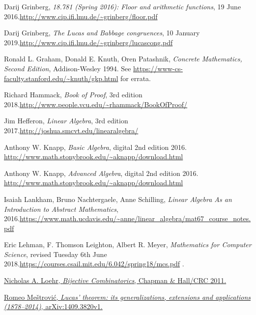 \documentclass[numbers=enddot,12pt,final,onecolumn,notitlepage]{scrartcl}%
\numberwithin{exer}{subsection}
\theoremstyle{definition}
\begin{document}
\begin{thebibliography}{999999999}
Darij Grinberg, \textit{18.781 (Spring 2016): Floor
and arithmetic functions}, 19 June 2016.\newline\url{http://www.cip.ifi.lmu.de/~grinberg/floor.pdf}

Darij Grinberg, \textit{The Lucas and Babbage
congruences}, 10 January 2019.\newline\url{http://www.cip.ifi.lmu.de/~grinberg/lucascong.pdf}

Ronald L. Graham, Donald E. Knuth, Oren Patashnik,
\textit{Concrete Mathematics, Second Edition}, Addison-Wesley 1994.\newline
See \url{https://www-cs-faculty.stanford.edu/~knuth/gkp.html} for errata.

Richard Hammack, \textit{Book of Proof}, 3rd
edition 2018.\newline\url{http://www.people.vcu.edu/~rhammack/BookOfProof/}

Jim Hefferon, \textit{Linear Algebra}, 3rd edition
2017.\newline\url{http://joshua.smcvt.edu/linearalgebra/}

Anthony W. Knapp, \textit{Basic Algebra}, digital
2nd edition 2016. \newline\url{http://www.math.stonybrook.edu/~aknapp/download.html}

Anthony W. Knapp, \textit{Advanced Algebra}, digital
2nd edition 2016. \newline\url{http://www.math.stonybrook.edu/~aknapp/download.html}

Isaiah Lankham, Bruno Nachtergaele, Anne
Schilling, \textit{Linear Algebra As an Introduction to Abstract Mathematics},
2016.\newline\url{https://www.math.ucdavis.edu/~anne/linear_algebra/mat67_course_notes.pdf}

Eric Lehman, F. Thomson Leighton, Albert R. Meyer,
\textit{Mathematics for Computer Science}, revised Tuesday 6th June
2018.\newline\url{https://courses.csail.mit.edu/6.042/spring18/mcs.pdf} .

%
\href{http://www.math.vt.edu/people/nloehr/bijbook.html}{Nicholas A. Loehr,
\textit{Bijective Combinatorics}, Chapman \& Hall/CRC 2011.}

\href{https://arxiv.org/abs/1409.3820v1}{Romeo
Me\v{s}trovi\'{c}, \textit{Lucas' theorem: its generalizations, extensions and
applications (1878--2014)}, arXiv:1409.3820v1.}


\end{thebibliography}
\end{document}
